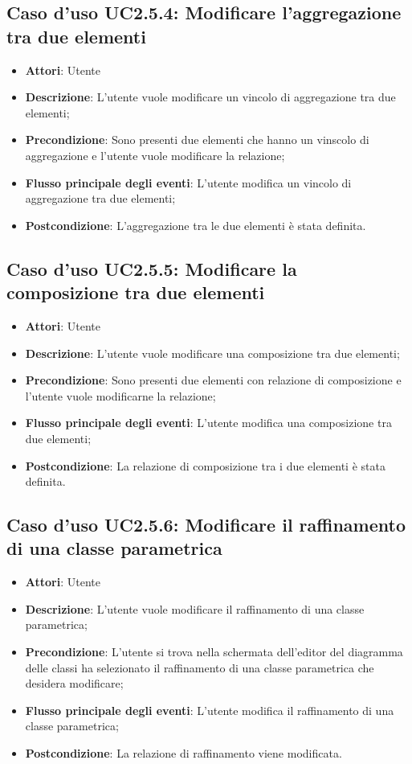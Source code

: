 \documentclass[../AnalisiDeiRequisiti.tex]{subfiles}
\begin{document}
		\subsection{Caso d'uso UC2.5.4: Modificare l'aggregazione tra due elementi}
		\begin{itemize}
			\item \textbf{Attori}: Utente
			\item \textbf{Descrizione}: L'utente vuole modificare un vincolo di aggregazione tra due elementi;
			\item \textbf{Precondizione}: Sono presenti due elementi che hanno un vinscolo di aggregazione e l'utente vuole modificare la relazione;
			\item \textbf{Flusso principale degli eventi}: L'utente modifica un vincolo di aggregazione tra due elementi;
			\item \textbf{Postcondizione}: L'aggregazione tra le due elementi è stata definita.
		\end{itemize}
		\subsection{Caso d'uso UC2.5.5: Modificare la composizione tra due elementi}
		\begin{itemize}
			\item \textbf{Attori}: Utente
			\item \textbf{Descrizione}: L'utente vuole modificare una composizione tra due elementi;
			\item \textbf{Precondizione}: Sono presenti due elementi con relazione di composizione e l'utente vuole modificarne la relazione;
			\item \textbf{Flusso principale degli eventi}: L'utente modifica una composizione tra due elementi;
			\item \textbf{Postcondizione}: La relazione di composizione tra i due elementi è stata definita.	
		\end{itemize}
		\subsection{Caso d'uso UC2.5.6: Modificare il raffinamento di una classe parametrica}
		\begin{itemize}
			\item \textbf{Attori}: Utente
			\item \textbf{Descrizione}: L'utente vuole modificare il raffinamento di una classe parametrica;
			\item \textbf{Precondizione}: L'utente si trova nella schermata dell'editor del diagramma delle classi ha selezionato il raffinamento di una classe parametrica che desidera modificare;
			\item \textbf{Flusso principale degli eventi}: L'utente modifica il raffinamento di una classe parametrica;
			\item \textbf{Postcondizione}: La relazione di raffinamento viene modificata.
		\end{itemize}
\end{document}
